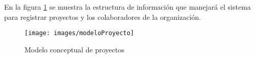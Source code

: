 En la figura \ref{fig:modeloProyecto} se muestra la estructura de información que manejará el sistema para registrar proyectos y los colaboradores de la organización.

\begin{figure}[htbp!]
	\begin{center}
		\texttt{[image: images/modeloProyecto]}
		\caption{Modelo conceptual de proyectos}
		\label{fig:modeloProyecto}
	\end{center}
\end{figure}








